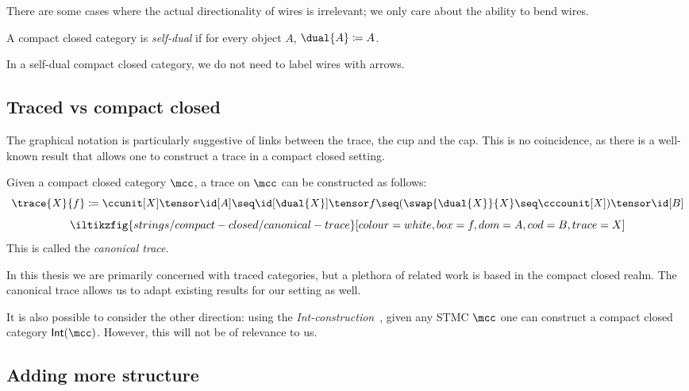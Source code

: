 

There are some cases where the actual directionality of wires is irrelevant;
we only care about the ability to bend wires.

\begin{definition}
    A compact closed category is \emph{self-dual} if for every object \(A\),
    \(\dual{A} \coloneqq A\).
\end{definition}

In a self-dual compact closed category, we do not need to label wires with
arrows.

\subsection{Traced vs compact closed}

The graphical notation is particularly suggestive of links between the
trace, the cup and the cap.
This is no coincidence, as there is a well-known result that allows one to
construct a trace in a compact closed setting.

\begin{proposition}
    \label{prop:canonical-trace}
    Given a compact closed category \(\mcc\), a trace on \(\mcc\) can be
    constructed as follows: \[
        \trace{X}{f}
        \coloneqq
        \ccunit[X] \tensor \id[A]
        \seq
        \id[\dual{X}] \tensor f
        \seq
        (\swap{\dual{X}}{X} \seq \cccounit[X]) \tensor \id[B]
    \]
    \[
        \iltikzfig{strings/compact-closed/canonical-trace}[colour=white,box=f,dom=A,cod=B,trace=X]
    \]
    This is called the \emph{canonical trace}.
\end{proposition}

In this thesis we are primarily concerned with traced categories, but a plethora
of related work is based in the compact closed realm.
The canonical trace allows us to adapt existing results for our setting as well.

\begin{remark}
    It is also possible to consider the other direction: using the
    \emph{Int-construction}~\cite{joyal1996traced}, given any STMC
    \(\mcc\) one can construct a compact closed category \(\mathsf{Int}(\mcc)\).
    However, this will not be of relevance to us.
\end{remark}

\subsection{Adding more structure}

